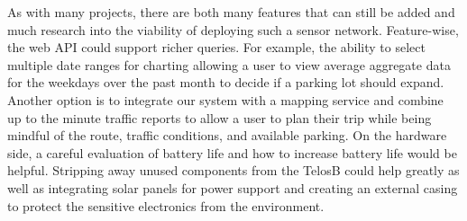 \documentclass{acm_proc}
\begin{document}
As with many projects, there are both many features that can still be added
and much research into the viability of deploying such a sensor network.
Feature-wise, the web API could support richer queries.
For example, the ability to select multiple date ranges for charting
allowing a user to view average aggregate data for the weekdays over the
past month to decide if a parking lot should expand.
Another option is to integrate our system with a mapping service and
combine up to the minute traffic reports to allow a user to plan their trip
while being mindful of the route, traffic conditions, and available
parking.
On the hardware side, a careful evaluation of battery life and how to
increase battery life would be helpful.
Stripping away unused components from the TelosB could help greatly as well
as integrating solar panels for power support and creating an external
casing to protect the sensitive electronics from the environment.



\end{document}
